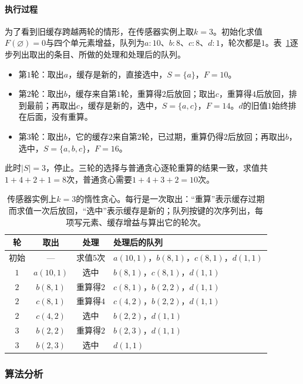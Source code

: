 \paragraph{执行过程}
为了看到旧缓存跨越两轮的情形，在传感器实例上取$k=3$。初始化求值$F(\varnothing)=0$与四个单元素增益，队列为$a{:}10$、$b{:}8$、$c{:}8$、$d{:}1$，轮次都是$1$。表~\ref{tab:graph-setfn-lazy-trace}逐步列出取出的条目、所做的处理和处理后的队列。
\begin{itemize}
  \item 第$1$轮：取出$a$，缓存是新的，直接选中，$S=\{a\}$，$F=10$。
  \item 第$2$轮：取出$b$，缓存来自第$1$轮，重算得$2$后放回；取出$c$，重算得$4$后放回，排到最前；再取出$c$，缓存是新的，选中，$S=\{a,c\}$，$F=14$。$d$的旧值$1$始终排在后面，没有重算。
  \item 第$3$轮：取出$b$，它的缓存$2$来自第$2$轮，已过期，重算仍得$2$后放回；再取出$b$，选中，$S=\{a,b,c\}$，$F=16$。
\end{itemize}
此时$|S|=3$，停止。三轮的选择与普通贪心逐轮重算的结果一致，求值共$1+4+2+1=8$次，普通贪心需要$1+4+3+2=10$次。

\begin{table}[!htb]
  \centering
  \caption{传感器实例上$k=3$的惰性贪心。每行是一次取出：“重算”表示缓存过期而求值一次后放回，“选中”表示缓存是新的；队列按键的次序列出，每项写元素、缓存增益与算出它的轮次。}
  \label{tab:graph-setfn-lazy-trace}
  \small
  \begin{tabular}{@{}cccl@{}}
    \toprule
    轮 & 取出 & 处理 & 处理后的队列 \\
    \midrule
    初始 & — & 求值$5$次 & $a(10,1)$，$b(8,1)$，$c(8,1)$，$d(1,1)$ \\
    $1$ & $a(10,1)$ & 选中 & $b(8,1)$，$c(8,1)$，$d(1,1)$ \\
    $2$ & $b(8,1)$ & 重算得$2$ & $c(8,1)$，$b(2,2)$，$d(1,1)$ \\
    $2$ & $c(8,1)$ & 重算得$4$ & $c(4,2)$，$b(2,2)$，$d(1,1)$ \\
    $2$ & $c(4,2)$ & 选中 & $b(2,2)$，$d(1,1)$ \\
    $3$ & $b(2,2)$ & 重算得$2$ & $b(2,3)$，$d(1,1)$ \\
    $3$ & $b(2,3)$ & 选中 & $d(1,1)$ \\
    \bottomrule
  \end{tabular}
\end{table}

\subsubsection{算法分析}

